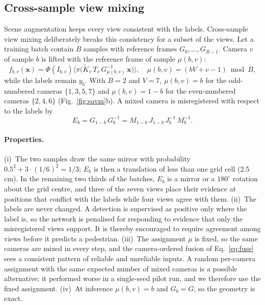 \documentclass[10pt,twocolumn,letterpaper]{article}
\begin{document}
\subsection{Cross-sample view mixing}
\label{sec:vm}

Scene augmentation keeps every view consistent with the labels. Cross-sample view mixing deliberately breaks this
consistency for a subset of the views. Let a training batch contain $B$ samples with reference frames
$G_0, \dots, G_{B-1}$. Camera $v$ of sample $b$ is lifted with the reference frame of sample $\mu(b, v)$:
\begin{equation}
  f_{b,v}(\mathbf{x}) = \Phi(I_{b,v})\big\langle \pi\big(\tilde{K}_v\, T_v\, G_{\mu(b,v)}^{-1}\, \mathbf{x}\big)
  \big\rangle, \quad \mu(b, v) = (bV + v - 1) \bmod B,
  \label{eq:mix}
\end{equation}
while the labels remain $y_b$. With $B = 2$ and $V = 7$, $\mu(b, v) = b$ for the odd-numbered cameras
$\{1, 3, 5, 7\}$ and $\mu(b, v) = 1 - b$ for the even-numbered cameras $\{2, 4, 6\}$ (Fig.~\ref{fig:savm}b).
A mixed camera is misregistered with respect to the labels by
\begin{equation}
  E_b = G_{1-b}\, G_b^{-1} = M_{1-b}\, J_{1-b}\, J_b^{-1}\, M_b^{-1}.
  \label{eq:misreg}
\end{equation}

\paragraph{Properties.}
(i)~The two samples draw the same mirror with probability $0.5^2 + 3 \cdot (1/6)^2 = 1/3$; $E_b$ is then a
translation of less than one grid cell (2.5\,cm). In the remaining two thirds of the batches, $E_b$ is a mirror or
a $180^\circ$ rotation about the grid centre, and three of the seven views place their evidence at positions that
conflict with the labels while four views agree with them.
(ii)~The labels are never changed. A detection is supervised as positive only where the label is, so the network is
penalised for responding to evidence that only the misregistered views support. It is thereby encouraged to require
agreement among views before it predicts a pedestrian.
(iii)~The assignment $\mu$ is fixed, so the same cameras are mixed in every step, and the camera-ordered fusion of
Eq.~\eqref{eq:fuse} sees a consistent pattern of reliable and unreliable inputs. A random per-camera assignment with
the same expected number of mixed cameras is a possible alternative; it performed worse in a single-seed pilot run,
and we therefore use the fixed assignment.
(iv)~At inference $\mu(b, v) = b$ and $G_b = G$, so the geometry is exact.
\end{document}
